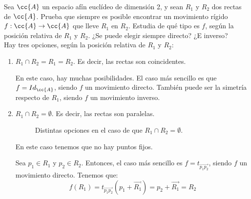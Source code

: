 \begin{ejercicio}
    Sea $\cc{A}$ un espacio afín euclídeo de dimensión 2, y sean $R_1$ y $R_2$ dos rectas de $\cc{A}$.
    Prueba que siempre es posible encontrar un movimiento rígido $f : \cc{A} \to \cc{A}$ que lleve $R_1$ en $R_2$.
    Estudia de qué tipo es $f$, según la posición relativa de $R_1$ y $R_2$. ¿Se puede elegir siempre directo? ¿E inverso?\\

    Hay tres opciones, según la posición relativa de $R_1$ y $R_2$:
    \begin{enumerate}
        \item $R_1\cap R_2 = R_1 = R_2$. Es decir, las rectas son coincidentes.
        
        En este caso, hay muchas posibilidades. El caso más sencillo es que $f=Id_{\cc{A}}$, siendo $f$ un movimiento directo.
        También puede ser la simetría respecto de $R_1$, siendo $f$ un movimiento inverso.

        \item $R_1\cap R_2 = \emptyset$. Es decir, las rectas son paralelas.
        
        \begin{figure}[H]
            \centering
            \caption{Distintas opciones en el caso de que $R_1\cap R_2 = \emptyset$.}
        \end{figure}

        En este caso tenemos que no hay puntos fijos.

        Sea $p_1\in R_1$ y $p_2\in R_2$. Entonces, el caso más sencillo es $f=t_{\vec{p_1p_2}}$, siendo $f$ un movimiento directo. Tenemos que:
        \begin{equation*}
            f(R_1) = t_{\vec{p_1p_2}}\left(p_1 + \vec{R_1}\right) = p_2 + \vec{R_1} = R_2
        \end{equation*}


\end{enumerate}
\end{ejercicio}
